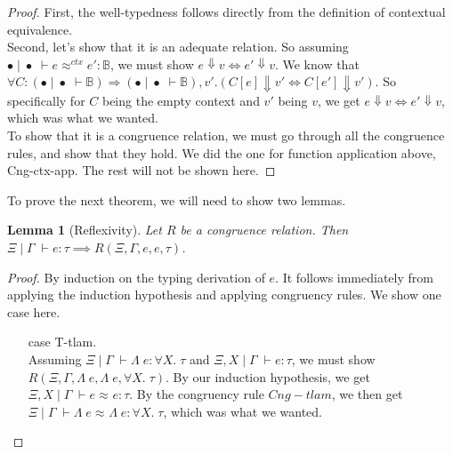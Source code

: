 \documentclass[twoside,11pt,openright]{report}
\newtheorem{lemma}[theorem]{Lemma}
\theoremstyle{definition}
\newcommand{\expr}{e}
\newcommand{\val}{v}
\newcommand{\Tvar}{X}
\newcommand{\Tlam}{\Lambda\;}
\newcommand{\ctx}{C}
\newcommand{\Tbool}{\mathbb{B}}
\newcommand{\Tall}[2]{\forall #1.\; #2}
\newcommand{\typ}{\tau}
\newcommand{\venv}{\Gamma}
\newcommand{\tenv}{\Xi}
\newcommand{\emptenv}{\bullet}
\newcommand{\empvenv}{\bullet}
\newcommand{\jdg}[4]{#1 \; | \; #2 \; \vdash #3 : #4}
\newcommand{\jdgType}[3]{#1 \; | \; #2 \; \vdash #3}
\newcommand{\jdgRel}[6]{#1 \; | \; #2 \; \vdash #3 \approx^{#4} #5 : #6}
\newcommand{\ctxRel}[5]{\jdgRel{#1}{#2}{#3}{ctx}{#4}{#5}}
\begin{document}
\begin{proof}
  First, the well-typedness follows directly from the definition of contextual equivalence.\\
  Second, let's show that it is an adequate relation. So assuming $\ctxRel{\emptenv}{\empvenv}{\expr}{\expr'}{\Tbool}$, we must show $\expr \Downarrow \val \iff \expr' \Downarrow \val$. We know that $\forall \ctx : (\jdgType{\emptenv}{\empvenv}{\Tbool}) \Rightarrow (\jdgType{\emptenv}{\empvenv}{\Tbool}), \val' . (\ctx[\expr] \Downarrow \val' \iff \ctx[\expr'] \Downarrow \val')$. So specifically for $C$ being the empty context and $\val'$ being $\val$, we get $\expr \Downarrow \val \iff \expr' \Downarrow \val$, which was what we wanted.\\
  To show that it is a congruence relation, we must go through all the congruence rules, and show that they hold. We did the one for function application above, Cng-ctx-app. The rest will not be shown here.
\end{proof}

To prove the next theorem, we will need to show two lemmas.
\begin{lemma}[Reflexivity]\label{lem:R_Cng_is_reflexive}
  Let $R$ be a congruence relation. Then $\jdg{\tenv}{\venv}{\expr}{\typ} \implies R(\tenv, \venv, \expr, \expr, \typ)$.
\end{lemma}
\begin{proof}
  By induction on the typing derivation of $\expr$. It follows immediately from applying the induction hypothesis and applying congruency rules. We show one case here.
  \begin{itemize}
    \item[case] T-tlam.\\
      Assuming $\jdg{\tenv}{\venv}{\Tlam \expr}{\Tall{\Tvar}{\typ}}$ and $\jdg{\tenv, \Tvar}{\venv}{\expr}{\typ}$, we must show $R(\tenv, \venv, \Tlam \expr, \Tlam \expr, \Tall{\Tvar}{\typ})$. By our induction hypothesis, we get $\jdgRel{\tenv, \Tvar}{\venv}{\expr}{}{\expr}{\typ}$. By the congruency rule $Cng-tlam$, we then get $\jdgRel{\tenv}{\venv}{\Tlam \expr}{}{\Tlam \expr}{\Tall{\Tvar}{\typ}}$, which was what we wanted.
  \end{itemize}
\end{proof}
\end{document}
